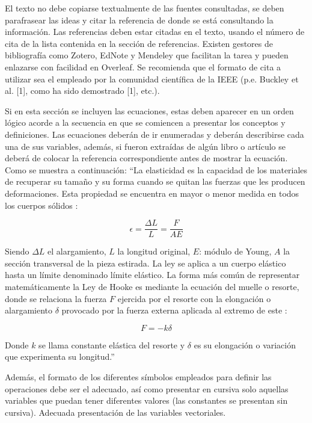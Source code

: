 \documentclass{replab}
\begin{document}
El texto no debe copiarse textualmente de las fuentes consultadas, se deben parafrasear las ideas y citar la referencia de donde se está consultando la información. Las referencias deben estar citadas en el texto, usando el número de cita de la lista contenida en la sección de referencias. Existen gestores de bibliografía como Zotero, EdNote y Mendeley que facilitan la tarea y pueden enlazarse con facilidad en Overleaf. Se recomienda que el formato de cita a utilizar sea el empleado por la comunidad científica de la IEEE (p.e. Buckley et al. [1], como ha sido demostrado [1], etc.).

Si en esta sección se incluyen las ecuaciones, estas deben aparecer en un orden lógico acorde a la secuencia en que se comiencen a presentar los conceptos y definiciones.
Las ecuaciones deberán de ir enumeradas y deberán describirse cada una de sus variables, además, si fueron extraídas de algún libro o artículo se deberá de colocar la referencia correspondiente antes de mostrar la ecuación. Como se muestra a continuación:
“La elasticidad es la capacidad de los materiales de recuperar su tamaño y su forma cuando se quitan las fuerzas que les producen deformaciones. Esta propiedad se encuentra en mayor o menor medida en todos los cuerpos sólidos \cite{hecht}:

\begin{equation}
    \epsilon = \frac{\Delta L}{L} = \frac{F}{AE}
\end{equation}

Siendo $\Delta L$ el alargamiento, $L$ la longitud original, $E$: módulo de Young, $A$ la sección transversal de la pieza estirada. La ley se aplica a un cuerpo elástico hasta un límite denominado límite elástico. La forma más común de representar matemáticamente la Ley de Hooke es mediante la ecuación del muelle o resorte, donde se relaciona la fuerza $F$ ejercida por el resorte con la elongación o alargamiento $\delta$ provocado por la fuerza externa aplicada al extremo de este \cite{feynman}:

\begin{equation}
    F = -k \delta
\end{equation}

Donde $k$ se llama constante elástica del resorte y $\delta$ es su elongación o variación que experimenta su longitud.”

Además, el formato de los diferentes símbolos empleados para definir las operaciones debe ser el adecuado, así como presentar en cursiva solo aquellas variables que puedan tener diferentes valores (las constantes se presentan sin cursiva). Adecuada presentación de las variables vectoriales.
\end{document}
